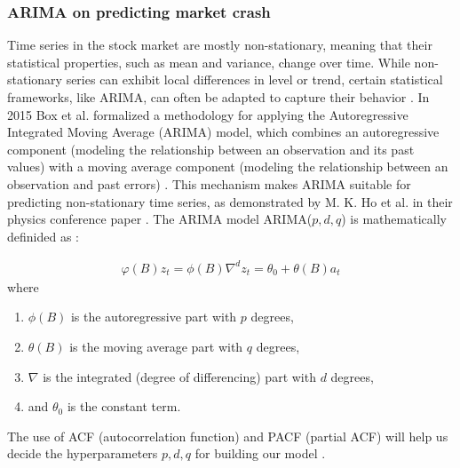 \documentclass[12pt, letterpaper]{article}
\begin{document}






\subsubsection*{ARIMA on predicting market crash}
Time series in the stock market are mostly non-stationary, meaning that their statistical properties, such as mean and variance, change over time. While non-stationary series can exhibit local differences in level or trend, certain statistical frameworks, like ARIMA, can often be adapted to capture their behavior \cite{ho2021}.
In 2015 Box et al. formalized a methodology for applying the Autoregressive Integrated Moving Average (ARIMA) model, which combines an autoregressive component (modeling the relationship between an observation and its past values) with a moving average component (modeling the relationship between an observation and past errors) \cite{box2015}.
This mechanism makes ARIMA suitable for predicting non-stationary time series, as demonstrated by M. K. Ho et al. in their physics conference paper \cite{ho2021}.
The ARIMA model ARIMA($p,d,q$) is mathematically definided as \cite{box2015}:
 {\small
\begin{align*}
    \varphi (B) z_t = \phi (B)\nabla^d z_t = \theta_0 + \theta (B)a_t
\end{align*}
where
\begin{enumerate}[label=\arabic*.]
    \item $\phi(B)$ is the autoregressive part with $p$ degrees,
    \item $\theta (B)$ is the moving average part with $q$ degrees,
    \item $\nabla$ is the integrated (degree of differencing) part with $d$ degrees,
    \item and $\theta_0$ is the constant term.
\end{enumerate}
}
    The use of ACF (autocorrelation function) and PACF (partial ACF) will help us decide the hyperparameters $p, d, q$ for building our model \cite{hyndman2018}.
\end{document}
